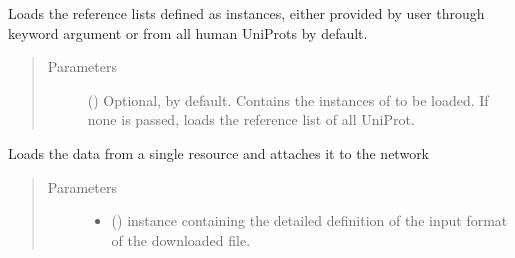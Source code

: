 \documentclass[letterpaper,10pt,english]{sphinxmanual}
\begin{document}
\begin{fulllineitems}
\begin{fulllineitems}
\begin{quote}
\begin{description}
\end{description}\end{quote}

\end{fulllineitems}


\begin{fulllineitems}
\label{\detokenize{main:pypath.main.PyPath.load_reflists}}
Loads the reference lists defined as
 instances, either
provided by user through keyword argument  or from
all human UniProts by default.
\begin{quote}\begin{description}
\item[{Parameters}] \leavevmode
{} () \textendash{} Optional,  by default. Contains the instances of
 to be loaded. If
none is passed, loads the reference list of all UniProt.

\end{description}\end{quote}

\end{fulllineitems}


\begin{fulllineitems}
\label{\detokenize{main:pypath.main.PyPath.load_resource}}
Loads the data from a single resource and attaches it to the
network
\begin{quote}\begin{description}
\item[{Parameters}] \leavevmode\begin{itemize}
\item {} 
 () \textendash{}  instance
containing the detailed definition of the input format of
the downloaded file.


\end{itemize}
\end{description}
\end{quote}
\end{fulllineitems}
\end{fulllineitems}
\end{document}
